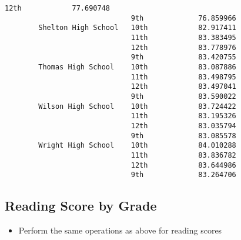 \documentclass[11pt]{article}
\providecommand{\tightlist}{%
      \setlength{\itemsep}{0pt}\setlength{\parskip}{0pt}}
\begin{document}
\begin{Verbatim}[commandchars=\\\{\}]
                              12th            77.690748
                              9th             76.859966
        Shelton High School   10th            82.917411
                              11th            83.383495
                              12th            83.778976
                              9th             83.420755
        Thomas High School    10th            83.087886
                              11th            83.498795
                              12th            83.497041
                              9th             83.590022
        Wilson High School    10th            83.724422
                              11th            83.195326
                              12th            83.035794
                              9th             83.085578
        Wright High School    10th            84.010288
                              11th            83.836782
                              12th            83.644986
                              9th             83.264706
\end{Verbatim}
            
    \subsection{Reading Score by Grade}\label{reading-score-by-grade}

    \begin{itemize}
\tightlist
\item
  Perform the same operations as above for reading scores
\end{itemize}
\end{document}
